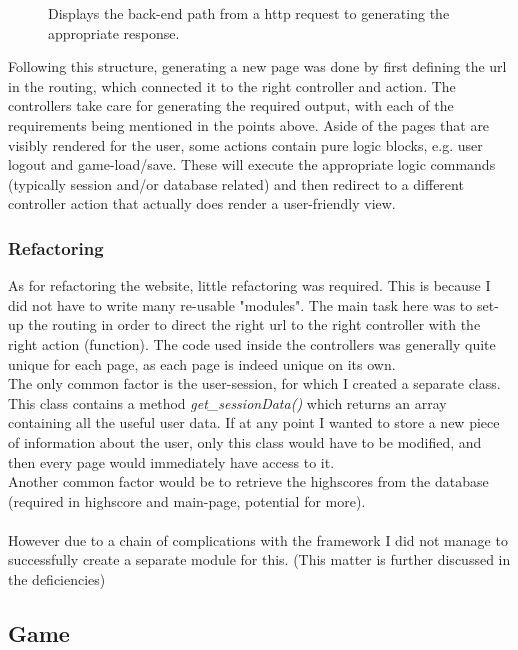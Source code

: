 \documentclass[12pt]{report}
\begin{document}
\begin{figure}[h]
\centering
{}
\caption{Displays the back-end path from a http request to generating the appropriate response.}
\end{figure}
Following this structure, generating a new page was done by first defining the url in the routing, which connected it to the right controller and action. The controllers take care for generating the required output, with each of the requirements being mentioned in the points above. Aside of the pages that are visibly rendered for the user, some actions contain pure logic blocks, e.g. user logout and game-load/save. These will execute the appropriate logic commands (typically session and/or database related) and then redirect to a different controller action that actually does render a user-friendly view.

\subsubsection{Refactoring}
As for refactoring the website, little refactoring was required. This is because I did not have to write many re-usable "modules". The main task here was to set-up the routing in order to direct the right url to the right controller with the right action (function). The code used inside the controllers was generally quite unique for each page, as each page is indeed unique on its own.\\
The only common factor is the user-session, for which I created a separate class. This class contains a method \emph{get\_sessionData()} which returns an array containing all the useful user data. If at any point I wanted to store a new piece of information about the user, only this class would have to be modified, and then every page would immediately have access to it.\\
Another common factor would be to retrieve the highscores from the database (required in highscore and main-page, potential for more).\\\\However due to a chain of complications with the framework I did not manage to successfully create a separate module for this. (This matter is further discussed in the deficiencies)

\subsection*{Game}
\end{document}
